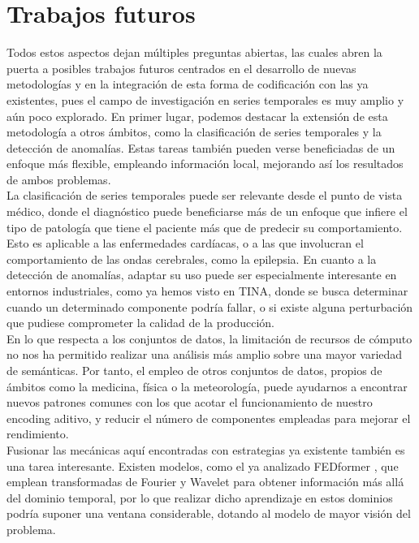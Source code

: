 \section{Trabajos futuros}

Todos estos aspectos dejan múltiples preguntas abiertas, las cuales abren la puerta a posibles trabajos futuros centrados en el desarrollo de nuevas metodologías y en la integración de esta forma de codificación con las ya existentes, pues el campo de investigación en series temporales es muy amplio y aún poco explorado. En primer lugar, podemos destacar la extensión de esta metodología a otros ámbitos, como la clasificación de series temporales y la detección de anomalías. Estas tareas también pueden verse beneficiadas de un enfoque más flexible, empleando información local, mejorando así los resultados de ambos problemas.\\ La clasificación de series temporales puede ser relevante desde el punto de vista médico, donde el diagnóstico puede beneficiarse más de un enfoque que infiere el tipo de patología que tiene el paciente más que de predecir su comportamiento. Esto es aplicable a las enfermedades cardíacas, o a las que involucran el comportamiento de las ondas cerebrales, como la epilepsia. En cuanto a la detección de anomalías, adaptar su uso puede ser especialmente interesante en entornos industriales, como ya hemos visto en TINA, donde se busca determinar cuando un determinado componente podría fallar, o si existe alguna perturbación que pudiese comprometer la calidad de la producción.\\

En lo que respecta a los conjuntos de datos, la limitación de recursos de cómputo no nos ha permitido realizar una análisis más amplio sobre una mayor variedad de semánticas. Por tanto, el empleo de otros conjuntos de datos, propios de ámbitos como la medicina, física o la meteorología, puede ayudarnos a encontrar nuevos patrones comunes con los que acotar el funcionamiento de nuestro encoding aditivo, y reducir el número de componentes empleadas para mejorar el rendimiento.\\

Fusionar las mecánicas aquí encontradas con estrategias ya existente también es una tarea interesante. Existen modelos, como el ya analizado FEDformer \cite{zhou2022fedformerfrequencyenhanceddecomposed}, que emplean transformadas de Fourier y Wavelet para obtener información más allá del dominio temporal, por lo que realizar dicho aprendizaje en estos dominios podría suponer una ventana considerable, dotando al modelo de mayor visión del problema.\\

